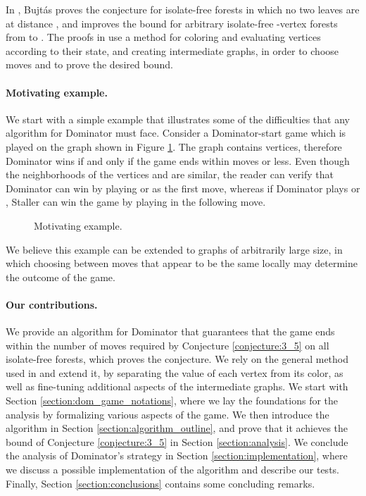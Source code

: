 \documentclass[11pt]{article}
\theoremstyle{definition}
\begin{document}
In \cite{bujtas2015domination}, Bujt\'as proves the conjecture for isolate-free forests in which no two leaves are at distance , 
and improves the bound for arbitrary isolate-free -vertex forests from  to .
The proofs in \cite{bujtas2015domination} use a method for coloring and evaluating vertices according to their state, and creating intermediate graphs, in order to choose moves and to prove the desired bound.


\paragraph{Motivating example.}
We start with a simple example that illustrates some of the difficulties that any algorithm for Dominator must face.
Consider a Dominator-start game which is played on the graph shown in Figure \ref{fig:locality_example_intro}.
The graph contains  vertices, therefore Dominator wins if and only if the game ends within  moves or less.
Even though the neighborhoods of the vertices  and  are similar, 
the reader can verify that Dominator can win by playing  or  as the first move, 
whereas if Dominator plays  or , Staller can win the game by playing  in the following move.

\begin{figure}[thbp]
  \caption{\sf Motivating example.}
  \medskip
  \centering
  \label{fig:locality_example_intro}
\end{figure}

We believe this example can be extended to graphs of arbitrarily large size, in which choosing between moves that appear to be the same locally may determine the outcome of the game. 


\paragraph{Our contributions.}
We provide an algorithm for Dominator that guarantees that the game ends within the number of moves required by Conjecture \ref{conjecture:3_5} on all isolate-free forests, which proves the conjecture.
We rely on the general method used in \cite{bujtas2015domination} and extend it, by separating the value of each vertex from its color, as well as fine-tuning additional aspects of the intermediate graphs. 
We start with Section \ref{section:dom_game_notations}, where we lay the foundations for the analysis by formalizing various aspects of the game.
We then introduce the algorithm in Section \ref{section:algorithm_outline}, and prove that it achieves the bound of Conjecture \ref{conjecture:3_5} in Section \ref{section:analysis}.
We conclude the analysis of Dominator's strategy in Section \ref{section:implementation}, where we discuss a possible implementation of the algorithm and describe our tests.
Finally, Section \ref{section:conclusions} contains some concluding remarks.
\end{document}
